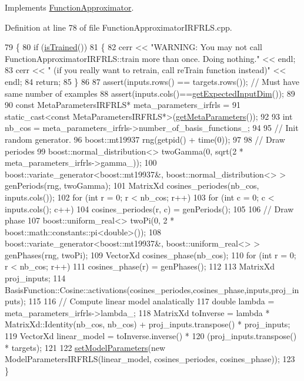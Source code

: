 Implements \hyperlink{classDmpBbo_1_1FunctionApproximator_a9781476c7d296da4aaf50e74cd273a75}{Function\+Approximator}.



Definition at line 78 of file Function\+Approximator\+I\+R\+F\+R\+L\+S.\+cpp.


\begin{DoxyCode}
79 \{
80   \textcolor{keywordflow}{if} (\hyperlink{classDmpBbo_1_1FunctionApproximator_a178135f623d9b9058870851a53299c6e}{isTrained}())  
81   \{
82     cerr << \textcolor{stringliteral}{"WARNING: You may not call FunctionApproximatorIRFRLS::train more than once. Doing nothing."} <<
       endl;
83     cerr << \textcolor{stringliteral}{"   (if you really want to retrain, call reTrain function instead)"} << endl;
84     \textcolor{keywordflow}{return};
85   \}
86   
87   assert(inputs.rows() == targets.rows()); \textcolor{comment}{// Must have same number of examples}
88   assert(inputs.cols()==\hyperlink{classDmpBbo_1_1FunctionApproximator_af5a550bcf65d5a29a153a594cc4e3fa1}{getExpectedInputDim}());
89   
90   \textcolor{keyword}{const} MetaParametersIRFRLS* meta\_parameters\_irfrls = 
91     \textcolor{keyword}{static\_cast<}\textcolor{keyword}{const }MetaParametersIRFRLS*\textcolor{keyword}{>}(\hyperlink{classDmpBbo_1_1FunctionApproximator_a6f1a44062eac61d88b647c358bcda155}{getMetaParameters}());
92 
93   \textcolor{keywordtype}{int} nb\_cos = meta\_parameters\_irfrls->number\_of\_basis\_functions\_;
94 
95   \textcolor{comment}{// Init random generator.}
96   boost::mt19937 rng(getpid() + time(0));
97 
98   \textcolor{comment}{// Draw periodes}
99   boost::normal\_distribution<> twoGamma(0, sqrt(2 * meta\_parameters\_irfrls->gamma\_));
100   boost::variate\_generator<boost::mt19937&, boost::normal\_distribution<> > genPeriods(rng, twoGamma);
101   MatrixXd cosines\_periodes(nb\_cos, inputs.cols());
102   \textcolor{keywordflow}{for} (\textcolor{keywordtype}{int} r = 0; r < nb\_cos; r++)
103     \textcolor{keywordflow}{for} (\textcolor{keywordtype}{int} c = 0; c < inputs.cols(); c++)
104       cosines\_periodes(r, c) = genPeriods();
105 
106   \textcolor{comment}{// Draw phase}
107   boost::uniform\_real<> twoPi(0, 2 * boost::math::constants::pi<double>());
108   boost::variate\_generator<boost::mt19937&, boost::uniform\_real<> > genPhases(rng, twoPi);
109   VectorXd cosines\_phase(nb\_cos);
110   \textcolor{keywordflow}{for} (\textcolor{keywordtype}{int} r = 0; r < nb\_cos; r++)
111       cosines\_phase(r) = genPhases();
112 
113   MatrixXd proj\_inputs;
114   BasisFunction::Cosine::activations(cosines\_periodes,cosines\_phase,inputs,proj\_inputs);
115   
116   \textcolor{comment}{// Compute linear model analatically}
117   \textcolor{keywordtype}{double} lambda = meta\_parameters\_irfrls->lambda\_;
118   MatrixXd toInverse = lambda * MatrixXd::Identity(nb\_cos, nb\_cos) + proj\_inputs.transpose() * proj\_inputs;
119   VectorXd linear\_model = toInverse.inverse() *
120     (proj\_inputs.transpose() * targets);
121 
122   \hyperlink{classDmpBbo_1_1FunctionApproximator_afd6f9d480456b90c4740c7aaca084ba4}{setModelParameters}(\textcolor{keyword}{new} ModelParametersIRFRLS(linear\_model, cosines\_periodes, 
      cosines\_phase));
123 \}
\end{DoxyCode}


